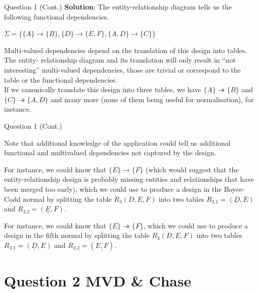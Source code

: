 \begin{frame}[fragile]{Question 1 (Cont.)}
\textbf{Solution}: The entity-relationship diagram tells us the following functional dependencies.\\ \vspace{5pt}

$\Sigma = \{\{A\}\rightarrow\{B\}, \{D\}\rightarrow\{E,F\}, \{A,D\}\rightarrow\{C\}\}$
\\ \vspace{10pt}

Multi-valued dependencies depend on the translation of this design into tables. The entity-
relationship diagram and its translation will only result in ``not interesting'' multi-valued dependencies, those are trivial or correspond to the table or the functional dependencies.\\ \vspace{5pt}
If we canonically translate this design into three tables, we have
$\{A\} \twoheadrightarrow \{B\}$ and $\{C\}\twoheadrightarrow \{A,D\}$ and many more (none of them being useful for normalisation), for instance.
\end{frame}

\begin{frame}[fragile]{Question 1 (Cont.)}
	
Note that additional knowledge of the application could tell us additional functional and multivalued dependencies not captured by the design.\\ \vspace{5pt}

For instance, we could know that $\{E\}\rightarrow\{F\}$ (which would suggest that the entity-relationship design is probably missing entities and relationships that have been merged too early), which we could use to produce a design in the Boyce-Codd normal by splitting the table $R_3(D,E,F)$ into two tables $R_{3.1}=(\underline{D},E)$ and $R_{3.2}=(\underline{E},F)$.\\ \vspace{5pt}

For instance, we could know that $\{E\}\twoheadrightarrow\{F\}$, which we could use to produce a design in the fifth normal by splitting the table $R_3(D,E,F)$ into two tables $R_{3.1}=(\underline{D},E)$ and $R_{3.2}=(\underline{E,F})$.	
\end{frame}

\section*{Question 2 MVD \& Chase}

